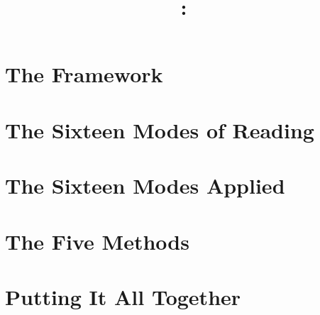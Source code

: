 \documentclass[11pt,openright]{book}
\title{\booktitle: \booksubtitle}
\author{\translatorname}
\begin{document}
\frontmatter


\cleardoublepage





\tableofcontents

\mainmatter
\pagestyle{main}

\part{The Framework}

\part{The Sixteen Modes of Reading}

\part{The Sixteen Modes Applied}

\part{The Five Methods}

\part{Putting It All Together}
\end{document}
